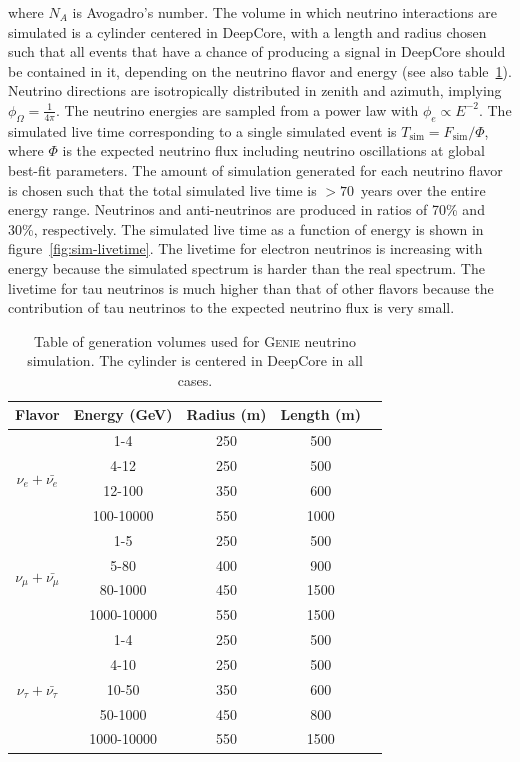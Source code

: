 where $N_A$ is Avogadro's number. The volume in which neutrino interactions are simulated is a cylinder centered in DeepCore, with a length and radius chosen such that all events that have a chance of producing a signal in DeepCore should be contained in it, depending on the neutrino flavor and energy (see also table~\ref{table:GENIE}). Neutrino directions are isotropically distributed in zenith and azimuth, implying $\phi_\Omega = \frac{1}{4\pi}$. The neutrino energies are sampled from a power law with $\phi_e \propto E^{-2}$. The simulated live time corresponding to a single simulated event is  $T_{\mathrm{sim}} =  F_{\mathrm{sim}} / \Phi$, where $\Phi$ is the expected neutrino flux including neutrino oscillations at global best-fit parameters. The amount of simulation generated for each neutrino flavor is chosen such that the total simulated live time is $>70$~years over the entire energy range. Neutrinos and anti-neutrinos are produced in ratios of 70\% and 30\%, respectively. The simulated live time as a function of energy is shown in figure~\ref{fig:sim-livetime}. The livetime for electron neutrinos is increasing with energy because the simulated spectrum is harder than the real spectrum. The livetime for tau neutrinos is much higher than that of other flavors because the contribution of tau neutrinos to the expected neutrino flux is very small.

\begin{table}
\caption{Table of generation volumes used for \textsc{Genie} neutrino simulation. The cylinder is centered in DeepCore in all cases. \label{table:GENIE}}
\begin{center}
\begin{tabular}{ ccccc } 
\textbf{Flavor} & \textbf{Energy (GeV)} & \textbf{Radius (m)} & \textbf{Length (m)}\\
\toprule
\multirow{4}{*}{$\nu_e+\bar{\nu_e}$}  & 1-4 & 250 & 500 \\
 & 4-12 & 250 & 500   \\ 
 & 12-100 & 350 & 600  \\
 & 100-10000 & 550 & 1000  \\
 \midrule
\multirow{4}{*}{$\nu_{\mu}+\bar{\nu_{\mu}}$} & 1-5 & 250 & 500\\
 & 5-80 & 400 & 900\\
 & 80-1000 & 450 & 1500\\
 & 1000-10000 & 550 & 1500\\
 \midrule
\multirow{5}{*}{$\nu_{\tau}+\bar{\nu_{\tau}}$} & 1-4 & 250 & 500\\
 & 4-10 & 250 & 500\\
 & 10-50 & 350 & 600\\
 & 50-1000 & 450 & 800\\
 & 1000-10000 & 550 & 1500\\
 \bottomrule
\end{tabular}
\end{center}
\end{table}

